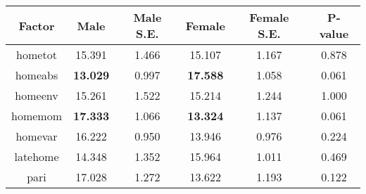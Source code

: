 \begin{longtable}{c c c c c c}
\toprule
\textbf{Factor} & \textbf{Male} & \textbf{Male S.E.}  & \textbf{Female} & \textbf{Female S.E.} & \textbf{P-value} \\
\midrule
hometot & 15.391 & 1.466 &  15.107 & 1.167 & 0.878 \\
homeabs &  \textbf{13.029} & 0.997 &   \textbf{17.588} & 1.058 &0.061 \\
homeenv & 15.261 & 1.522 &  15.214 & 1.244 & 1.000 \\
homemom &  \textbf{17.333} & 1.066 &   \textbf{13.324} & 1.137 &0.061 \\
homevar & 16.222 & 0.950 &  13.946 & 0.976 & 0.224 \\
latehome & 14.348 & 1.352 &  15.964 & 1.011 & 0.469 \\
pari & 17.028 & 1.272 &  13.622 & 1.193 & 0.122 \\
\bottomrule
\end{longtable}
